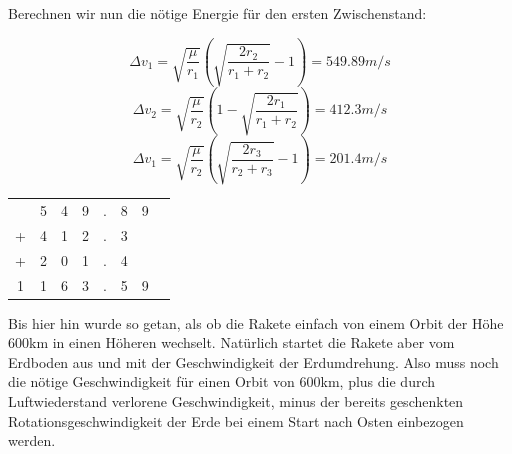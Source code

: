 \documentclass[12pt,paper=A4,numbers=noenddot,bibliography=totoc,listof=totoc,DIV=11,BCOR=1mm]{scrreprt}
\begin{document}
Berechnen wir nun die nötige Energie für den ersten Zwischenstand:

\begin{equation*}
\Delta v_{1} = \sqrt{\frac{\mu}{r_{1}}} \left( \sqrt{\frac{2r_{2}}{r_{1}+r_{2}}}-1 \right)
             = 549.89 m/s
\end{equation*}
\begin{equation*}
\Delta v_{2} = \sqrt{\frac{\mu}{r_{2}}} \left( 1-\sqrt{\frac{2r_{1}}{r_{1}+r_{2}}} \right)
             = 412.3 m/s
\end{equation*}
\begin{equation*}
\Delta v_{1} = \sqrt{\frac{\mu}{r_{2}}} \left( \sqrt{\frac{2r_{3}}{r_{2}+r_{3}}}-1 \right)
             = 201.4 m/s
\end{equation*}

\begin{flushright}
\begin{tabular}{c@{\,}c@{\,}c@{\,}c@{\,}c@{\,}c@{\,}c@{\,}c}
  & 5 & 4 & 9 & . & 8 & 9 \\ 
+ & 4 & 1 & 2 & . & 3 &   \\ 
+ & 2 & 0 & 1 & . & 4 &   \\ 
\hline 
1 & 1 & 6 & 3 & . & 5 & 9 \\ 
\end{tabular}
\end{flushright}

Bis hier hin wurde so getan, als ob die Rakete einfach von einem Orbit der Höhe 600km in einen Höheren wechselt. Natürlich startet die Rakete aber vom Erdboden aus und mit der Geschwindigkeit der Erdumdrehung. Also muss noch die nötige Geschwindigkeit für einen Orbit von 600km, plus die durch Luftwiederstand verlorene Geschwindigkeit, minus der bereits geschenkten Rotationsgeschwindigkeit der Erde bei einem Start nach Osten einbezogen werden.\\
\end{document}
